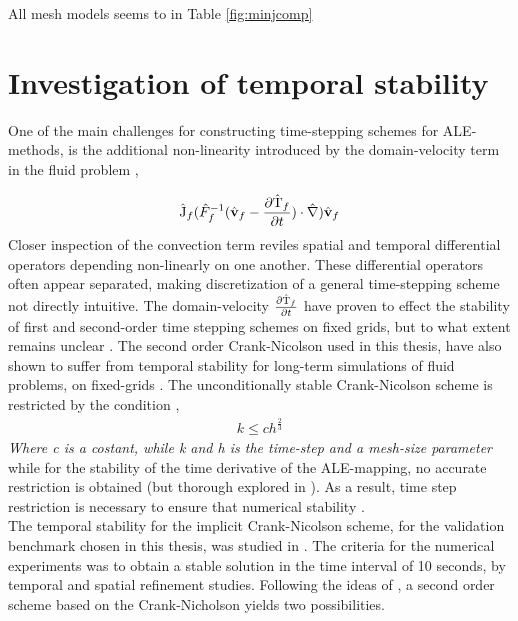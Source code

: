 All mesh models seems to  in Table \ref{fig:minjcomp}

\newpage

\section{Investigation of temporal stability}
One of the main challenges for constructing time-stepping schemes for ALE-methods, is the additional non-linearity introduced by the domain-velocity term in the fluid problem \cite{Formaggia2004}, 

\begin{align}
\text{\^{J}}_f (\hat{F}_f^{-1}(\hat{\mathbf{v}}_f - \frac{\partial \text{\^{T}}_f}{\partial t}) \cdot \hat{\nabla}) \hat{\mathbf{v}}_f
\end{align} 
Closer inspection of the convection term reviles spatial and temporal differential operators depending non-linearly on one another. These differential operators often appear separated, making discretization of a general time-stepping scheme not directly intuitive. The domain-velocity $ \frac{\partial \text{\^{T}}_f}{\partial t}$ have proven to effect the stability of first and second-order time stepping schemes on fixed grids, but to what extent remains unclear  \cite{Formaggia2004, Formaggia1991}. The second order Crank-Nicolson used in this thesis, have also shown to suffer from temporal stability for long-term simulations of fluid problems, on fixed-grids \cite{Wick2013a}.
The  unconditionally stable Crank-Nicolson scheme is restricted by the condition \cite{Wick2013a},
\begin{align}
k \leq ch^{\frac{2}{3}} 
\end{align}
\textit{Where c is a costant, while k and h is the time-step and a mesh-size parameter } \\

while for the stability of the time derivative of the ALE-mapping, no accurate restriction is obtained (but thorough explored in \cite{Formaggia2004}). As a result, time step restriction is necessary to ensure that numerical stability  \cite{Formaggia2004}.  \\

The temporal stability for the implicit Crank-Nicolson scheme, for the validation benchmark chosen in this thesis, was studied in  \cite{Richter2015}. The criteria for the numerical experiments was to obtain a stable solution in the time interval of 10 seconds, by temporal and spatial refinement studies.  Following the ideas of \cite{Richter2015}, a second order scheme based on the Crank-Nicholson yields two possibilities.

